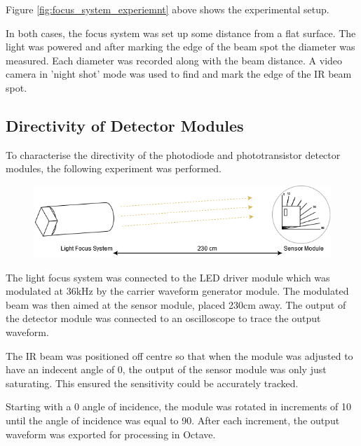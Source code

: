 Figure \ref{fig:focus_system_experiemnt} above shows the experimental setup.

In both cases, the focus system was set up some distance from a flat surface. The light was powered and after marking the edge of the beam spot the diameter was measured. Each diameter was recorded along with the beam distance. A video camera in 'night shot' mode was used to find and mark the edge of the IR beam spot.





\subsection{Directivity of Detector Modules}

To characterise the directivity of the photodiode and phototransistor detector modules, the following experiment was performed.

\begin{figure}[H]
	\centering
	\includegraphics[width=.9\linewidth]{figures/experimentation/beam_angle_of_receiver.png}
	\label{fig:directivity_experiement_setup}
\end{figure}

The light focus system was connected to the LED driver module which was modulated at 36kHz by the carrier waveform generator module. The modulated beam was then aimed at the sensor module, placed 230cm away. The output of the detector module was connected to an oscilloscope to trace the output waveform.

The IR beam was positioned off centre so that when the module was adjusted to have an indecent angle of 0\textdegree{}, the output of the sensor module was only just saturating. This ensured the sensitivity could be accurately tracked.

Starting with a 0\textdegree{} angle of incidence, the module was rotated in increments of 10\textdegree{} until the angle of incidence was equal to 90\textdegree. After each increment, the output waveform was exported for processing in Octave.

